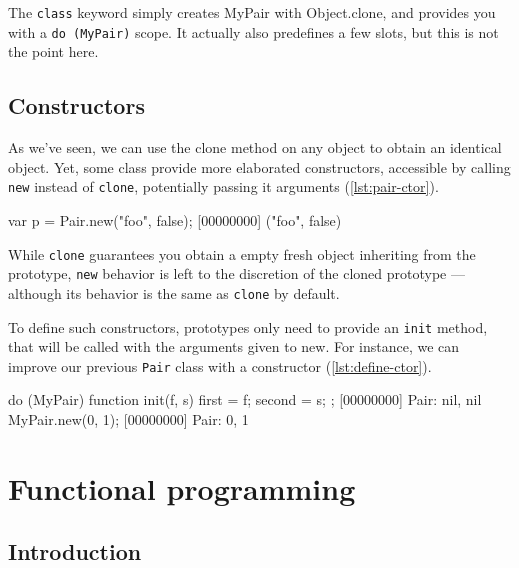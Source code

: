 \documentclass[openright,twoside,12pt]{report}
\begin{document}
The \texttt{class} keyword simply creates MyPair with Object.clone,
and provides you with a \lstinline|do (MyPair)| scope. It actually also
predefines a few slots, but this is not the point here.

\section{Constructors}

As we've seen, we can use the clone method on any object to obtain an
identical object. Yet, some class provide more elaborated
constructors, accessible by calling \texttt{new} instead of
\texttt{clone}, potentially passing it arguments (\autoref{lst:pair-ctor}).

\begin{urbiscript}[caption=Calling constructors with \texttt{new},
label=lst:pair-ctor]
var p = Pair.new("foo", false);
[00000000] ("foo", false)
\end{urbiscript}

While \texttt{clone} guarantees you obtain a empty fresh object
inheriting from the prototype, \texttt{new} behavior is left to the
discretion of the cloned prototype --- although its behavior is the
same as \texttt{clone} by default.

To define such constructors, prototypes only need to provide an
\texttt{init} method, that will be called with the arguments given to
new. For instance, we can improve our previous \texttt{Pair} class
with a constructor (\autoref{lst:define-ctor}).

\begin{urbiscript}[caption=Defining constructors,
  label=lst:define-ctor, name=my-pair]
do (MyPair)
{
  function init(f, s)
  {
    first = f;
    second = s;
  }
};
[00000000] Pair: nil, nil
MyPair.new(0, 1);
[00000000] Pair: 0, 1
\end{urbiscript}


\chapter{Functional programming}
\label{section:functional}

\section{Introduction}
\end{document}
